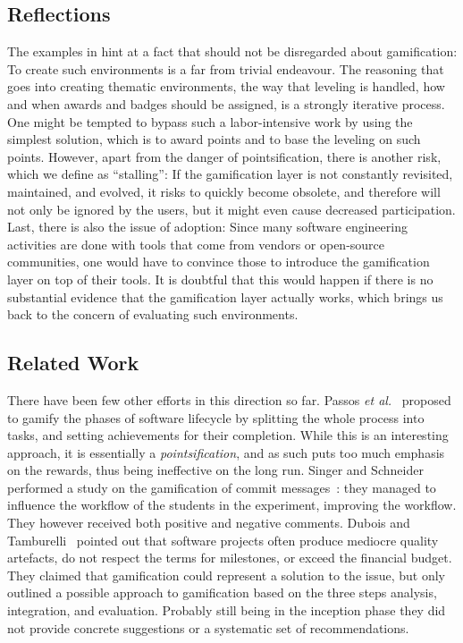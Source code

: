\subsection{Reflections}

The examples in  hint at a fact that should not be disregarded about gamification: To create such environments is a far from trivial endeavour. The reasoning that goes into creating thematic environments, the way that leveling is handled, how and when awards and badges should be assigned, is a strongly iterative process. One might be tempted to bypass such a labor-intensive work by using the simplest solution, which is to award points and to base the leveling on such points. However, apart from the danger of pointsification, there is another risk, which we define as ``stalling'': If the gamification layer is not constantly revisited, maintained, and evolved, it risks to quickly become obsolete, and therefore will not only be ignored by the users, but it might even cause decreased participation.
Last, there is also the issue of adoption: Since many software engineering activities are done with tools that come from vendors or open-source communities, one would have to convince those to introduce the gamification layer on top of their tools. It is doubtful that this would happen if there is no substantial evidence that the gamification layer actually works, which brings us back to the concern of evaluating such environments.

\subsection{Related Work}

There have been few other efforts in this direction so far. Passos \textit{et al.}~\cite{PassosMNC11} proposed to gamify the phases of software lifecycle by splitting the whole process into tasks, and setting achievements for their completion. While this is an interesting approach, it is essentially a \emph{pointsification}, and as such puts too much emphasis on the rewards, thus being ineffective on the long run.
Singer and Schneider performed a study on the gamification of commit messages~\cite{sing2012}: they managed to influence the workflow of the students in the experiment, improving the workflow. They however received both positive and negative comments. Dubois and Tamburelli~\cite{Dubois2013a} pointed out that software projects often produce mediocre quality artefacts, do not respect the terms for milestones, or exceed the financial budget. They claimed that gamification could represent a solution to the issue, but only outlined a possible approach to gamification based on the three steps analysis, integration, and evaluation. Probably still being in the inception phase they did not provide concrete suggestions or a systematic set of recommendations.

